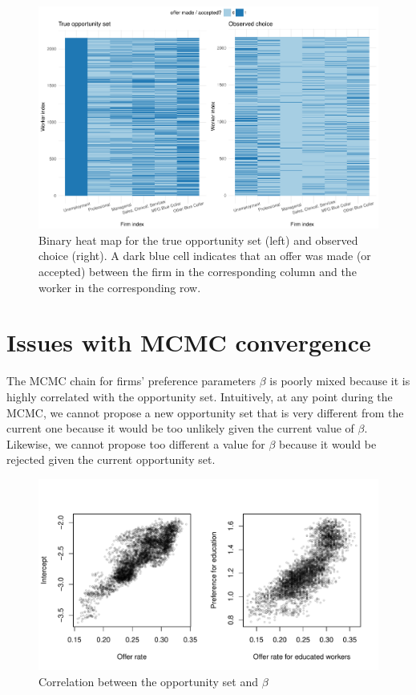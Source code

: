\begin{figure}[!ht]
  \centering
  \includegraphics[width=\textwidth,keepaspectratio]{../figure/sim_labor_nojobs_trueopp_obschoice}
  \caption[True opportunity set vs observed choice.]{Binary heat map for the true opportunity set (left) and observed
    choice (right). A dark blue cell indicates that an offer was made (or accepted)
    between the firm in the corresponding column and the worker in the corresponding
    row.}
  \label{fig:sim_labor_nojobs_trueopp_obschoice}
\end{figure}

\section{Issues with MCMC convergence}
\label{sec:simulation_beta_opp_correlation}

The MCMC chain for firms' preference parameters $\beta$ is poorly mixed because
it is highly correlated with the opportunity set. Intuitively, at any point
during the MCMC, we cannot propose a new opportunity set that is very different
from the current one because it would be too unlikely given the current value of
$\beta$. Likewise, we cannot propose too different a value for $\beta$ because
it would be rejected given the current opportunity set.

\begin{figure}[tbp]
  \centering
  \includegraphics[width=\textwidth,keepaspectratio]{../figure/sim_labor_nojobs_opp_beta_correlation_managerial}
  \caption{Correlation between the opportunity set and $\beta$}
  \label{fig:sim_labor_nojobs_opp_beta_correlation_managerial}
\end{figure}


